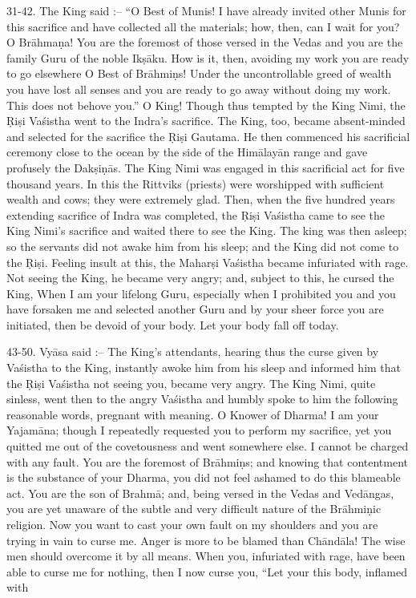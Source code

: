 31-42. The King said :-- ``O Best of Munis! I have already invited other Munis for this sacrifice and have collected all the materials; how, then, can I wait for you? O Br\=ahma\d{n}a! You are the foremost of those versed in the Vedas and you are the family Guru of the noble Ik\d{s}\=aku. How is it, then, avoiding my work you are ready to go elsewhere O Best of Br\=ahmi\d{n}s! Under the uncontrollable greed of wealth you have lost all senses and you are ready to go away without doing my work. This does not behove you.'' O King! Though thus tempted by the King Nimi, the \d{R}i\d{s}i Va\'sistha went to the Indra's sacrifice. The King, too, became absent-minded and selected for the sacrifice the \d{R}i\d{s}i Gautama. He then commenced his sacrificial ceremony close to the ocean by the side of the Him\=alay\=an range and gave profusely the Dak\d{s}i\d{n}\=as. The King Nimi was engaged in this sacrificial act for five thousand years. In this the Rittviks (priests) were worshipped with sufficient wealth and cows; they were extremely glad. Then, when the five hundred years extending sacrifice of Indra was completed, the \d{R}i\d{s}i Va\'sistha came to see the King Nimi's sacrifice and waited there to see the King. The king was then asleep; so the servants did not awake him from his sleep; and the King did not come to the \d{R}i\d{s}i. Feeling insult at this, the Mahar\d{s}i Va\'sistha became infuriated with rage. Not seeing the King, he became very angry; and, subject to this, he cursed the King, When I am your lifelong Guru, especially when I prohibited you and you have forsaken me and selected another Guru and by your sheer force you are initiated, then be devoid of your body. Let your body fall off today.

43-50. Vy\=asa said :-- The King's attendants, hearing thus the curse given by Va\'sistha to the King, instantly awoke him from his sleep and informed him that the \d{R}i\d{s}i Va\'sistha not seeing you, became very angry. The King Nimi, quite sinless, went then to the angry Va\'sistha and humbly spoke to him the following reasonable words, pregnant with meaning. O Knower of Dharma! I am your Yajam\=ana; though I repeatedly requested you to perform my sacrifice, yet you quitted me out of the covetousness and went somewhere else. I cannot be charged with any fault. You are the foremost of Br\=ahmi\d{n}s; and knowing that contentment is the substance of your Dharma, you did not feel ashamed to do this blameable act. You are the son of Brahm\=a; and, being versed in the Vedas and Ved\=angas, you are yet unaware of the subtle and very difficult nature of the Br\=ahmi\d{n}ic religion. Now you want to cast your own fault on my shoulders and you are trying in vain to curse me. Anger is more to be blamed than Ch\=and\=ala! The wise men should overcome it by all means. When you, infuriated with rage, have been able to curse me for nothing, then I now curse you, ``Let your this body, inflamed with


